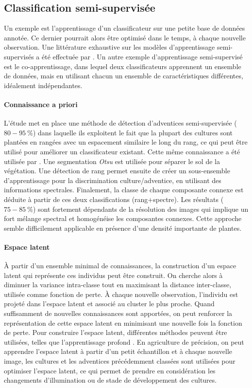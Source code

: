 \documentclass[../thesis.tex]{subfiles}
\begin{document}
    \newpage	
    \subsection{Classification semi-supervisée}
    
    Un exemple est l'apprentissage d'un classificateur sur une petite base de données annotée. Ce dernier pourrait alors être optimisé dans le temps, à chaque nouvelle observation. Une littérature exhaustive sur les modèles d'apprentissage semi-supervisés a été effectuée par \cite{Zhu06semi-supervisedlearning}. Un autre exemple d'apprentissage semi-supervisé est le co-apprentissage, dans lequel deux classificateurs apprennent un ensemble de données, mais en utilisant chacun un ensemble de caractéristiques différentes, idéalement indépendantes.
    
    \paragraph{Connaissance a priori} L'étude \cite{8206403} met en place une méthode de détection d'adventices semi-supervisée ($80-\SI{95}{\percent}$) dans laquelle ils exploitent le fait que la plupart des cultures sont plantées en rangées avec un espacement similaire le long du rang, ce qui peut être utilisé pour améliorer un classificateur existant. Cette même connaissance a été utilisée par \cite{rs10050761}. Une segmentation \textit{Otsu} est utilisée pour séparer le sol de la végétation. Une détection de rang permet ensuite de créer un sous-ensemble d'apprentissage pour la discrimination culture/adventice, en utilisant des informations spectrales. Finalement, la classe de chaque composante connexe est déduite à partir de ces deux classifications (rang+spectre). Les résultats ($75-\SI{85}{\percent}$) sont fortement dépendants de la résolution des images qui implique un fort mélange spectral et homogénéise les composantes connexes. Cette approche semble difficilement applicable en présence d'une densité importante de plantes. 
    
    \paragraph{Espace latent} À partir d'un ensemble minimal de connaissances, la construction d'un espace latent qui représente ces individus peut être construit. On cherche alors à diminuer la variance intra-classe tout en maximisant la distance inter-classe, utilisée comme fonction de perte. À chaque nouvelle observation, l'individu est projeté dans l'espace latent et associé au cluster le plus proche. Quand suffisamment de nouvelles connaissances sont apportées, on peut renforcer la représentation de cette espace latent en minimisant une nouvelle fois la fonction de perte. Pour construire l'espace latent, différentes méthodes peuvent être utilisées, telles que l'apprentissage profond \cite{Kamnitsas2018}. En agriculture de précision, on peut apprendre l'espace latent à partir d'un petit échantillon et à chaque nouvelle image, les cultures et les adventices précédemment classées sont utilisées pour optimiser l'espace latent, ce qui permet de prendre en considération les changements d'illumination ou de stade de développement des cultures.
    
\end{document}

